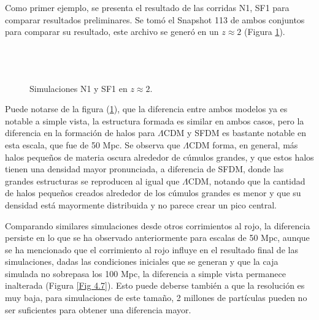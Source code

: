 \documentclass[a4paper,openright,12pt]{book}
\begin{document}
Como primer ejemplo, se presenta el resultado de las corridas N1, SF1 para comparar resultados preliminares. Se tomó el \textsf{Snapshot 113} de ambos conjuntos para comparar su resultado, este archivo se generó en un $z \approx 2$ (Figura \ref{Fig 4.6}).\\\\\\\

\begin{figure}
\centering
{}
\caption{\footnotesize{Simulaciones N1 y SF1 en $z\approx2$.}}\label{Fig 4.6}
\end{figure}

Puede notarse de la figura (\ref{Fig 4.6}), que la diferencia entre ambos modelos ya es notable a simple vista, la estructura formada es similar en ambos casos, pero la diferencia en la formación de halos para $\Lambda$CDM y SFDM es bastante notable en esta escala, que fue de 50 Mpc. Se observa que $\Lambda$CDM forma, en general, más halos pequeños de materia oscura alrededor de cúmulos grandes, y que estos halos tienen una densidad mayor pronunciada, a diferencia de SFDM, donde las grandes estructuras se reproducen al igual que $\Lambda$CDM, notando que la cantidad de halos pequeños creados alrededor de los cúmulos grandes es menor y que su densidad está mayormente distribuida y no parece crear un pico central.

Comparando similares simulaciones desde otros corrimientos al rojo, la diferencia persiste en lo que se ha observado anteriormente para escalas de 50 Mpc, aunque se ha mencionado que el corrimiento al rojo influye en el resultado final de las simulaciones, dadas las condiciones iniciales que se generan y que la caja simulada no sobrepasa los 100 Mpc, la diferencia a simple vista permanece inalterada (Figura \ref{Fig 4.7}). Esto puede deberse también a que la resolución es muy baja, para simulaciones de este tamaño, 2 millones de partículas pueden no ser suficientes para obtener una diferencia mayor.
\end{document}
